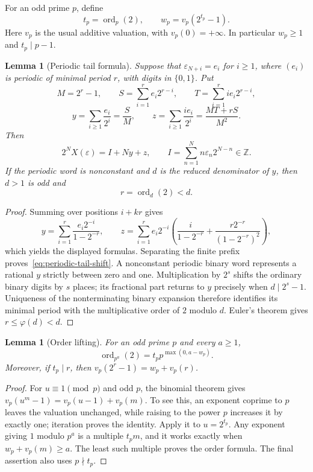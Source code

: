 \documentclass[11pt]{article}
\newtheorem{lemma}[theorem]{Lemma}
\theoremstyle{definition}
\theoremstyle{remark}
\DeclareMathOperator{\ord}{ord}
\begin{document}
For an odd prime $p$, define
\[
 t_p=\operatorname{ord}_p(2),\qquad
 w_p=v_p(2^{t_p}-1).
\]
Here $v_p$ is the usual additive valuation, with $v_p(0)=+\infty$. In particular $w_p\ge1$ and $t_p\mid p-1$.

\begin{lemma}[Periodic tail formula]\label{lem:periodic-tail-formula}
Suppose that $\varepsilon_{N+i}=e_i$ for $i\ge1$, where $(e_i)$ is periodic of minimal period $r$, with digits in $\{0,1\}$. Put
\[
 M=2^r-1,\qquad
 S=\sum_{i=1}^r e_i2^{r-i},\qquad
 T=\sum_{i=1}^r i e_i2^{r-i},
\]
\[
 y=\sum_{i\ge1}\frac{e_i}{2^i}=\frac{S}{M},\qquad
 z=\sum_{i\ge1}\frac{i e_i}{2^i}
   =\frac{MT+rS}{M^2}.
\]
Then
\begin{equation}\label{eq:periodic-tail-shift}
 2^NX(\varepsilon)=I+Ny+z,
 \qquad I=\sum_{n=1}^{N}n\varepsilon_n2^{N-n}\in\mathbb Z.
\end{equation}
If the periodic word is nonconstant and $d$ is the reduced denominator of $y$, then $d>1$ is odd and
\[
 r=\operatorname{ord}_d(2)<d.
\]
\end{lemma}

\begin{proof}
Summing over positions $i+kr$ gives
\[
 y=\sum_{i=1}^r\frac{e_i2^{-i}}{1-2^{-r}},\qquad
 z=\sum_{i=1}^r e_i2^{-i}
 \left(\frac{i}{1-2^{-r}}+
       \frac{r2^{-r}}{(1-2^{-r})^2}\right),
\]
which yields the displayed formulas. Separating the finite prefix proves~\eqref{eq:periodic-tail-shift}. A nonconstant periodic binary word represents a rational $y$ strictly between zero and one. Multiplication by $2^s$ shifts the ordinary binary digits by $s$ places; its fractional part returns to $y$ precisely when $d\mid 2^s-1$. Uniqueness of the nonterminating binary expansion therefore identifies its minimal period with the multiplicative order of $2$ modulo $d$. Euler's theorem gives $r\le\varphi(d)<d$.
\end{proof}


\begin{lemma}[Order lifting]\label{lem:order-lifting}
For an odd prime $p$ and every $a\ge1$,
\[
 \ord_{p^a}(2)=t_p p^{\max(0,a-w_p)}.
\]
Moreover, if $t_p\mid r$, then
$v_p(2^r-1)=w_p+v_p(r)$.
\end{lemma}
\begin{proof}
For $u\equiv1\pmod p$ and odd $p$, the binomial theorem gives
$v_p(u^m-1)=v_p(u-1)+v_p(m)$. To see this, an exponent coprime to
$p$ leaves the valuation unchanged, while raising to the power $p$
increases it by exactly one; iteration proves the identity.
Apply it to $u=2^{t_p}$. Any exponent giving $1$ modulo $p^a$ is a
multiple $t_pm$, and it works exactly when $w_p+v_p(m)\ge a$.
The least such multiple proves the order formula. The final assertion
also uses $p\nmid t_p$.
\end{proof}
\end{document}
